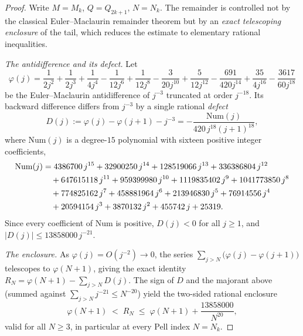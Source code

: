 \documentclass[12pt]{amsart}
\theoremstyle{definition}
\begin{document}
\begin{proof}
  Write $M = M_k$, $Q = Q_{2k+1}$, $N = N_k$.  The remainder is
  controlled not by the classical Euler--Maclaurin remainder theorem but
  by an \emph{exact telescoping enclosure} of the tail, which reduces the
  estimate to elementary rational inequalities.

  \emph{The antidifference and its defect.}  Let
  \begin{equation}\label{eq:phidef}
    \varphi(j) = \frac{1}{2j^{2}}+\frac{1}{2j^{3}}+\frac{1}{4j^{4}}
      -\frac{1}{12j^{6}}+\frac{1}{12j^{8}}-\frac{3}{20j^{10}}
      +\frac{5}{12j^{12}}-\frac{691}{420j^{14}}+\frac{35}{4j^{16}}
      -\frac{3617}{60j^{18}}
  \end{equation}
  be the Euler--Maclaurin antidifference of $j^{-3}$ truncated at order
  $j^{-18}$.  Its backward difference differs from $j^{-3}$ by a single
  rational \emph{defect}
  \begin{equation}\label{eq:defectdef}
    D(j) := \varphi(j)-\varphi(j+1)-j^{-3}
          = -\frac{\mathrm{Num}(j)}{420\,j^{18}(j+1)^{18}},
  \end{equation}
  where $\mathrm{Num}(j)$ is a degree-$15$ polynomial with sixteen
  positive integer coefficients,
  \begin{align}\label{eq:Num}
    \mathrm{Num}(j)
      &= 4386700\,j^{15}+32900250\,j^{14}+128519066\,j^{13}
         +336386804\,j^{12}\notag\\
      &\quad+647615118\,j^{11}+959399980\,j^{10}+1119835402\,j^{9}
         +1041773850\,j^{8}\notag\\
      &\quad+774825162\,j^{7}+458881964\,j^{6}+213946830\,j^{5}
         +76914556\,j^{4}\notag\\
      &\quad+20594154\,j^{3}+3870132\,j^{2}+455742\,j+25319 .
  \end{align}
  Since every coefficient of $\mathrm{Num}$ is positive, $D(j)<0$ for all
  $j\ge 1$, and $|D(j)|\le 13858000\,j^{-21}$.

  \emph{The enclosure.}  As $\varphi(j)=O(j^{-2})\to 0$, the series
  $\sum_{j>N}\bigl(\varphi(j)-\varphi(j+1)\bigr)$ telescopes to
  $\varphi(N+1)$, giving the exact identity
  $R_N = \varphi(N+1) - \sum_{j>N} D(j)$.  The sign of $D$ and the
  majorant above (summed against $\sum_{j>N}j^{-21}\le N^{-20}$) yield the
  two-sided rational enclosure
  \begin{equation}\label{eq:enclosure}
    \varphi(N+1)\;<\;R_N\;\le\;\varphi(N+1)+\frac{13858000}{N^{20}},
  \end{equation}
  valid for all $N\ge 3$, in particular at every Pell index $N=N_k$.


\end{proof}
\end{document}
